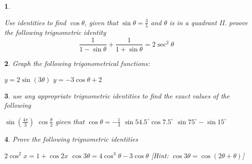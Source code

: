 \documentclass{article}
\theoremstyle{custom}
\newtheorem{question}{}
\begin{document}
\begin{question}
    \begin{tasks}
        \task Use identities to find $\cos{\theta}$, given that $\sin{\theta} = \frac{3}{5}$ and $\theta$ is in a quadrant II.
        \vspace{7 cm}
        \task proove the following trignometric identity
        \begin{equation}
            \frac{1}{1 - \sin{\theta}} + \frac{1}{1 + \sin{\theta}} = 2 \sec^2 \theta
        \end{equation}
        \vspace{7 cm}
    \end{tasks}
\end{question}

\begin{question}
    Graph the following trigonometrical functions:
    \begin{tasks}
        \task $y = 2 \sin{(3\theta)}$
        \vspace{7 cm}
        \task $y = -3\cos{\theta} + 2$
        \vspace{7 cm}
    \end{tasks}
\end{question}

\begin{question}
    use any appropriate trignometric identities to find the exact values of the following
    \begin{tasks}
        \task $\sin{(\frac{4\pi}{3})}$
        \vspace{7 cm}
        \task $\cos{\frac{\theta}{2}}$ given that $\cos\theta = -\frac{1}{3}$
        \vspace{7 cm}
        \task $\sin 54.5^{\circ} \cos 7.5^{\circ}$
        \vspace{7 cm}
        \task $\sin 75^{\circ} -  \sin 15^{\circ}$
        \vspace{7 cm}
    \end{tasks}
\end{question}

\begin{question}
    Prove the following trignometric identities
    \begin{tasks}
        \task $2 \cos^{2} x = 1 + \cos {2x}$
        \vspace{7 cm}
        \task $\cos{3\theta} = 4 \cos^3 \theta - 3 \cos\theta$  [Hint: $\cos{3\theta} = \cos{(2\theta + \theta)}$]
        \vspace{7 cm}
    \end{tasks}
\end{question}
\end{document}
